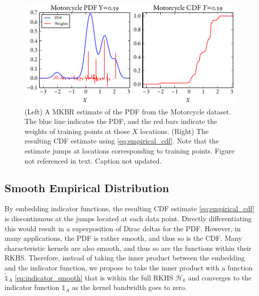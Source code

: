 \documentclass[twoside]{article} \usepackage{aistats2017}
\newcommand{\warn}[1]{{\color{RedOrange} #1}}
\begin{document}
		\begin{figure}
			\begin{center}
				\includegraphics[width=\columnwidth]{figures/cumulativeexampleragged}
			\end{center}
			\caption{\small (Left) A MKBR estimate of the PDF from the Motorcycle dataset. The blue line indicates the PDF, and the red bars indicate the weights of training points at those $X$ locations. (Right) The resulting CDF estimate using \eqref{eq:empirical_cdf}. Note that the estimate jumps at locations corresponding to training points. \warn{Figure not referenced in text. Caption not updated.}}
			\label{fig:cumulativeragged} 
		\end{figure}
			
	\subsection{Smooth Empirical Distribution}
	
		
		By embedding indicator functions, the resulting CDF estimate \eqref{eq:empirical_cdf} is discontinuous at the jumps located at each data point. Directly differentiating this would result in a superposition of Dirac deltas for the PDF. However, in many applications, the PDF is rather smooth, and thus so is the CDF. Many characteristic kernels are also smooth, and thus so are the functions within their RKHS. Therefore, instead of taking the inner product between the embedding and the indicator function, we propose to take the inner product with a function $\tilde{\mathbb{1}}_{A}$ \eqref{eq:indicator_smooth} that is within the full RKHS $\mathcal{H}_{k}$ and converges to the indicator function $\mathbb{1}_{A}$ as the kernel bandwidth goes to zero.
		
\end{document}

